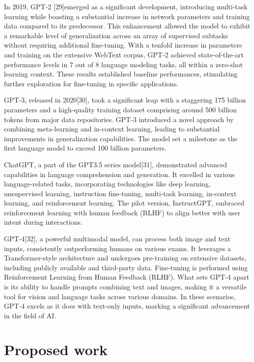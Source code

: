 \documentclass[conference]{IEEEtran}
\begin{document}
In 2019, GPT-2 [29]emerged as a significant development, introducing multi-task learning while boasting a substantial increase in network parameters and training data compared to its predecessor. This enhancement allowed the model to exhibit a remarkable level of generalization across an array of supervised subtasks without requiring additional fine-tuning. With a tenfold increase in parameters and training on the extensive WebText corpus, GPT-2 achieved state-of-the-art performance levels in 7 out of 8 language modeling tasks, all within a zero-shot learning context. These results established baseline performances, stimulating further exploration for fine-tuning in specific applications.

GPT-3, released in 2020[30], took a significant leap with a staggering 175 billion parameters and a high-quality training dataset comprising around 500 billion tokens from major data repositories. GPT-3 introduced a novel approach by combining meta-learning and in-context learning, leading to substantial improvements in generalization capabilities. The model set a milestone as the first language model to exceed 100 billion parameters.

ChatGPT, a part of the GPT3.5 series model[31], demonstrated advanced capabilities in language comprehension and generation. It excelled in various language-related tasks, incorporating technologies like deep learning, unsupervised learning, instruction fine-tuning, multi-task learning, in-context learning, and reinforcement learning. The pilot version, InstructGPT, embraced reinforcement learning with human feedback (RLHF) to align better with user intent during interactions.

GPT-4[32], a powerful multimodal model, can process both image and text inputs, consistently outperforming humans on various exams. It leverages a Transformer-style architecture and undergoes pre-training on extensive datasets, including publicly available and third-party data. Fine-tuning is performed using Reinforcement Learning from Human Feedback (RLHF). What sets GPT-4 apart is its ability to handle prompts combining text and images, making it a versatile tool for vision and language tasks across various domains. In these scenarios, GPT-4 excels as it does with text-only inputs, marking a significant advancement in the field of AI.
 
\section{Proposed work}
\end{document}
